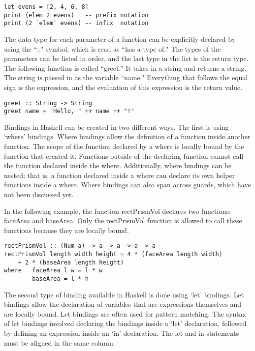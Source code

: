 \documentclass[titlepage,12pt]{article}
\begin{document}
\begin{verbatim}
let evens = [2, 4, 6, 8]
print (elem 2 evens)   -- prefix notation
print (2 `elem` evens) -- infix  notation
\end{verbatim}

The data type for each parameter of a function can be explicitly declared by using the ``::" symbol, which is read as ``has a type of." The types of the parameters can be listed in order, and the last type in the list is the return type. The following function is called ``greet."
It takes in a string and returns a string. The string is passed in as the variable ``name." Everything that follows the equal sign is the expression, and the evaluation of this expression is the return value. 

\begin{verbatim}
greet :: String -> String
greet name = "Hello, " ++ name ++ "!"
\end{verbatim}

Bindings in Haskell can be created in two different ways. The first is using `where' bindings. Where bindings allow the definition of a function inside another function. The scope of the function declared by a where is locally bound by the function that created it. Functions outside of the declaring function cannot call the function declared inside the where. Additionally, where bindings can be nested; that is, a function declared inside a where can declare its own helper functions inside a where. Where bindings can also span across guards, which have not been discussed yet. 

In the following example, the function rectPrismVol declares two functions: faceArea and baseArea. Only the rectPrismVol function is allowed to call these functions because they are locally bound. 

\begin{verbatim}
rectPrismVol :: (Num a) -> a -> a -> a -> a
rectPrismVol length width height = 4 * (faceArea length width)
    + 2 * (baseArea length height)
where   faceArea l w = l * w
        baseArea = l * h
\end{verbatim}

The second type of binding available in Haskell is done using `let' bindings. Let bindings allow the declaration of variables that are expressions themselves and are locally bound. Let bindings are often used for pattern matching. The syntax of let bindings involved declaring the bindings inside a `let' declaration, followed by defining an expression inside an `in' declaration. The let and in statements must be aligned in the same column. 
\end{document}
